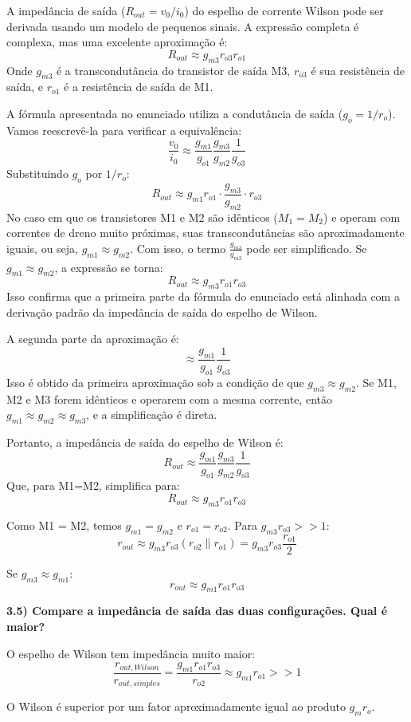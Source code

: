 ﻿\documentclass[12pt,a4paper]{article}
\begin{document}
A impedância de saída ($R_{out} = v_0/i_0$) do espelho de corrente Wilson pode ser derivada usando um modelo de pequenos sinais. A expressão completa é complexa, mas uma excelente aproximação é:
$$ R_{out} \approx g_{m3}r_{o3}r_{o1} $$
Onde $g_{m3}$ é a transcondutância do transistor de saída M3, $r_{o3}$ é sua resistência de saída, e $r_{o1}$ é a resistência de saída de M1.

A fórmula apresentada no enunciado utiliza a condutância de saída ($g_o = 1/r_o$). Vamos reescrevê-la para verificar a equivalência:
$$ \frac{v_{0}}{i_{0}} \approx \frac{g_{m1}}{g_{o1}} \frac{g_{m3}}{g_{m2}} \frac{1}{g_{o3}} $$
Substituindo $g_o$ por $1/r_o$:
$$ R_{out} \approx g_{m1} r_{o1} \cdot \frac{g_{m3}}{g_{m2}} \cdot r_{o3} $$
No caso em que os transistores M1 e M2 são idênticos ($M_1 = M_2$) e operam com correntes de dreno muito próximas, suas transcondutâncias são aproximadamente iguais, ou seja, $g_{m1} \approx g_{m2}$. Com isso, o termo $\frac{g_{m3}}{g_{m2}}$ pode ser simplificado. Se $g_{m1} \approx g_{m2}$, a expressão se torna:
$$ R_{out} \approx g_{m3} r_{o1} r_{o3} $$
Isso confirma que a primeira parte da fórmula do enunciado está alinhada com a derivação padrão da impedância de saída do espelho de Wilson.

A segunda parte da aproximação é:
$$ \approx \frac{g_{m1}}{g_{o1}} \frac{1}{g_{o3}} $$
Isso é obtido da primeira aproximação sob a condição de que $g_{m3} \approx g_{m2}$. Se M1, M2 e M3 forem idênticos e operarem com a mesma corrente, então $g_{m1} \approx g_{m2} \approx g_{m3}$, e a simplificação é direta.

Portanto, a impedância de saída do espelho de Wilson é:
$$ \boxed{R_{out} \approx \frac{g_{m1}}{g_{o1}} \frac{g_{m3}}{g_{m2}} \frac{1}{g_{o3}}} $$
Que, para M1=M2, simplifica para:
$$ \boxed{R_{out} \approx g_{m3}r_{o1}r_{o3}} $$

Como M1 = M2, temos $g_{m1} = g_{m2}$ e $r_{o1} = r_{o2}$. Para $g_{m3} r_{o3} >> 1$:
$$r_{out} \approx g_{m3} r_{o3} (r_{o2} \parallel r_{o1}) = g_{m3} r_{o3} \frac{r_{o1}}{2}$$

Se $g_{m3} \approx g_{m1}$:
$$\boxed{r_{out} \approx g_{m1} r_{o1} r_{o3}}$$

\textbf{3.5) Compare a impedância de saída das duas configurações. Qual é maior?}

O espelho de Wilson tem impedância muito maior:
$$\frac{r_{out,Wilson}}{r_{out,simples}} = \frac{g_{m1} r_{o1} r_{o3}}{r_{o2}} \approx g_{m1} r_{o1} >> 1$$

O Wilson é superior por um fator aproximadamente igual ao produto $g_m r_o$.
\end{document}
